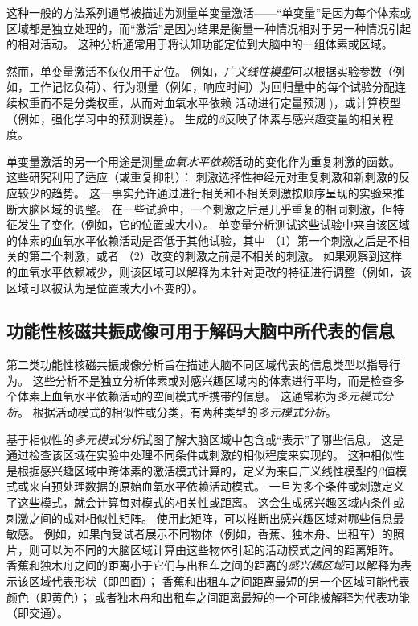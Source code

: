 这种一般的方法系列通常被描述为测量单变量激活——“单变量”是因为每个体素或区域都是独立处理的，而“激活”是因为结果是衡量一种情况相对于另一种情况引起的相对活动。
这种分析通常用于将认知功能定位到大脑中的一组体素或区域。


然而，单变量激活不仅仅用于定位。
例如，\textit{广义线性模型}可以根据实验参数（例如，工作记忆负荷）、行为测量（例如，响应时间）为回归量中的每个试验分配连续权重而不是分类权重，从而对血氧水平依赖 活动进行定量预测 )，或计算模型（例如，强化学习中的预测误差）。
生成的$\beta$反映了体素与感兴趣变量的相关程度。


单变量激活的另一个用途是测量\textit{血氧水平依赖}活动的变化作为重复刺激的函数。
这些研究利用了适应（或重复抑制）：
刺激选择性神经元对重复刺激和新刺激的反应较少的趋势。
这一事实允许通过进行相关和不相关刺激按顺序呈现的实验来推断大脑区域的调整。
在一些试验中，一个刺激之后是几乎重复的相同刺激，但特征发生了变化（例如，它的位置或大小）。
单变量分析测试这些试验中来自该区域的体素的血氧水平依赖活动是否低于其他试验，其中
（1）第一个刺激之后是不相关的第二个刺激，或者
（2）改变的刺激之前是不相关的刺激。
如果观察到这样的血氧水平依赖减少，则该区域可以解释为未针对更改的特征进行调整（例如，该区域可以被认为是位置或大小不变的）。


\subsection{功能性核磁共振成像可用于解码大脑中所代表的信息}

第二类功能性核磁共振成像分析旨在描述大脑不同区域代表的信息类型以指导行为。
这些分析不是独立分析体素或对感兴趣区域内的体素进行平均，而是检查多个体素上血氧水平依赖活动的空间模式所携带的信息。 
这通常称为\textit{多元模式分析}。
根据活动模式的相似性或分类，有两种类型的\textit{多元模式分析}。


基于相似性的\textit{多元模式分析}试图了解大脑区域中包含或“表示”了哪些信息。 
这是通过检查该区域在实验中处理不同条件或刺激的相似程度来实现的。 
这种相似性是根据感兴趣区域中跨体素的激活模式计算的，定义为来自广义线性模型的$\beta$值模式或来自预处理数据的原始血氧水平依赖活动模式。 
一旦为多个条件或刺激定义了这些模式，就会计算每对模式的相关性或距离。 
这会生成感兴趣区域内条件或刺激之间的成对相似性矩阵。 
使用此矩阵，可以推断出感兴趣区域对哪些信息最敏感。 
例如，如果向受试者展示不同物体（例如，香蕉、独木舟、出租车）的照片，则可以为不同的大脑区域计算由这些物体引起的活动模式之间的距离矩阵。
香蕉和独木舟之间的距离小于它们与出租车之间的距离的\textit{感兴趣区域}可以解释为表示该区域代表形状（即凹面）；
香蕉和出租车之间距离最短的另一个区域可能代表颜色（即黄色）；
或者独木舟和出租车之间距离最短的一个可能被解释为代表功能（即交通）。



